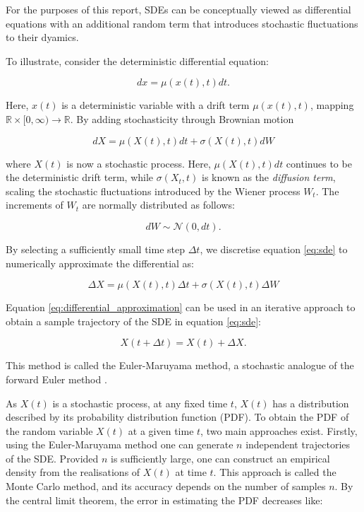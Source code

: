 For the purposes of this report, SDEs can be conceptually viewed as differential equations
with an additional random term that introduces stochastic fluctuations to their dyamics. 

To illustrate, consider the deterministic differential equation:

\begin{equation*}
    dx = \mu(x(t),t)dt.
\end{equation*}

Here, $x(t)$ is a deterministic variable with a drift term $\mu(x(t), t)$, mapping $\mathbb{R} \times[0, \infty) \to \mathbb{R}$. 
By adding stochasticity through Brownian motion

\begin{equation}\label{eq:sde}
    dX = \mu(X(t),t)dt + \sigma(X(t), t)dW
\end{equation}

where $X(t)$ is now a stochastic process. Here, $\mu(X(t), t)dt$ continues to be the deterministic drift term, while
$\sigma(X_t, t)$ is known as the \textit{diffusion term}, scaling the stochastic fluctuations introduced by the 
Wiener process $W_t$. The increments of $W_t$ are normally distributed as follows:

\begin{equation*}
    dW \sim \mathcal{N}(0, dt).
\end{equation*}

By selecting a sufficiently small time step $\Delta t$, we discretise equation \eqref{eq:sde} to 
numerically approximate the differential as:

\begin{equation}\label{eq:differential_approximation}
    \Delta X = \mu(X(t), t)\Delta t + \sigma(X(t), t) \Delta W
\end{equation}

Equation \eqref{eq:differential_approximation} can be used in an iterative approach to obtain a 
sample trajectory of the SDE in equation \eqref{eq:sde}:

\begin{equation}\label{eq:forward_euler}
    X(t + \Delta t) = X(t) + \Delta X.
\end{equation}

This method is called the Euler-Maruyama method, a stochastic
analogue of the forward Euler method \cite{erban2020stochastic}. 

As $X(t)$ is a stochastic process, 
at any fixed time $t$, $X(t)$ has a distribution described by its 
probability distribution function (PDF).
To obtain the PDF of the random variable $X(t)$ at a given time $t$, two main approaches exist. Firstly, using
the Euler-Maruyama method one can generate
$n$ independent trajectories of the SDE. Provided $n$ is sufficiently large, one can construct 
an empirical density from the realisations of $X(t)$ at time $t$. This approach is called the Monte Carlo method, 
and its accuracy depends on the number of samples $n$. By the central limit theorem, the error in 
estimating the PDF decreases like:

